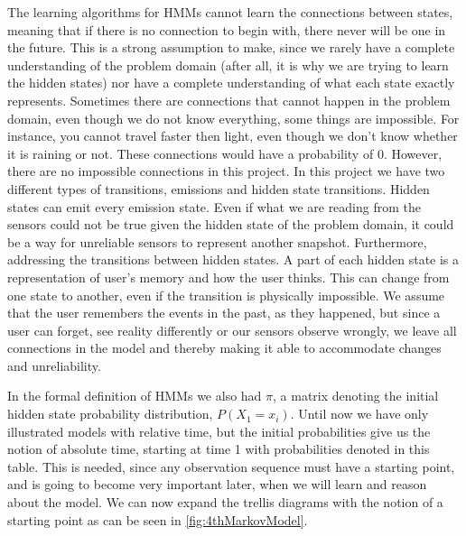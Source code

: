 The learning algorithms for HMMs cannot learn the connections between states, meaning that if there is no connection to begin with, there never will be one in the future. This is a strong assumption to make, since we rarely have a complete understanding of the problem domain (after all, it is why we are trying to learn the hidden states) nor have a complete understanding of what each state exactly represents. Sometimes there are connections that cannot happen in the problem domain, even though we do not know everything, some things are impossible. For instance, you cannot travel faster then light, even though we don't know whether it is raining or not. These connections would have a probability of $0$. However, there are no impossible connections in this project. In this project we have two different types of transitions, emissions and hidden state transitions. Hidden states can emit every emission state. Even if what we are reading from the sensors could not be true given the hidden state of the problem domain, it could be a way for unreliable sensors to represent another snapshot. Furthermore, addressing the transitions between hidden states. A part of each hidden state is a representation of user's memory and how the user thinks. This can change from one state to another, even if the transition is physically impossible. We assume that the user remembers the events in the past, as they happened, but since a user can forget, see reality differently or our sensors observe wrongly, we leave all connections in the model and thereby making it able to accommodate changes and unreliability.

In the formal definition of HMMs we also had $\pi$, a matrix denoting the initial hidden state probability distribution, $P(X_1=x_i)$. Until now we have only illustrated models with relative time, but the initial probabilities give us the notion of absolute time, starting at time 1 with probabilities denoted in this table. This is needed, since any observation sequence must have a starting point, and is going to become very important later, when we will learn and reason about the model. We can now expand the trellis diagrams with the notion of a starting point as can be seen in \cref{fig:4thMarkovModel}.


